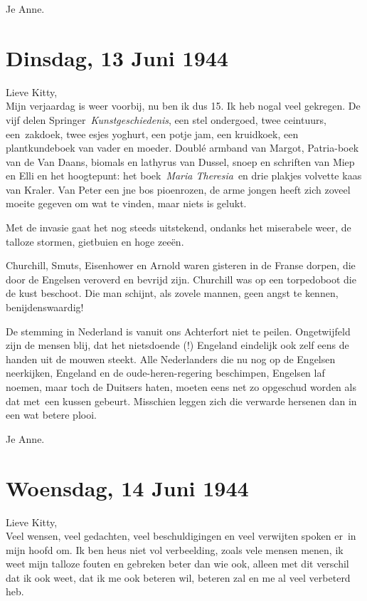 \documentclass{book}
\begin{document}
Je Anne.

\chapter{Dinsdag, 13 Juni 1944}

Lieve Kitty,\\Mijn verjaardag is weer voorbij, nu ben ik dus 15. Ik heb
nogal veel gekregen. De vijf delen Springer~\emph{Kunstgeschiedenis},
een stel ondergoed, twee ceintuurs, een~zakdoek, twee esjes yoghurt, een
potje jam, een kruidkoek, een plantkundeboek van vader en moeder. Doublé
armband van Margot, Patria-boek van de Van Daans, biomals en lathyrus
van Dussel, snoep en schriften van Miep en Elli en het hoogtepunt: het
boek~\emph{Maria Theresia}~en drie plakjes volvette kaas van Kraler. Van
Peter een jne bos pioenrozen, de arme jongen heeft zich zoveel moeite
gegeven om wat te vinden, maar niets is gelukt.

Met de invasie gaat het nog steeds uitstekend, ondanks het miserabele
weer, de talloze stormen, gietbuien en hoge zeeën.

Churchill, Smuts, Eisenhower en Arnold waren gisteren in de Franse
dorpen, die door de Engelsen veroverd en bevrijd zijn. Churchill was op
een torpedoboot die de kust beschoot. Die man schijnt, als zovele
mannen, geen angst te kennen, benijdenswaardig!

De stemming in Nederland is vanuit ons Achterfort niet te peilen.
Ongetwijfeld zijn de mensen blij, dat het nietsdoende (!) Engeland
eindelijk ook zelf eens de handen uit de mouwen steekt. Alle
Nederlanders die nu nog op de Engelsen neerkijken, Engeland en de
oude-heren-regering beschimpen, Engelsen laf noemen, maar toch de
Duitsers haten, moeten eens net zo opgeschud worden als dat met~een
kussen gebeurt. Misschien leggen zich die verwarde hersenen dan in een
wat betere plooi.

Je Anne.

\chapter{Woensdag, 14 Juni 1944}

Lieve Kitty,\\Veel wensen, veel gedachten, veel beschuldigingen en veel
verwijten spoken er~in mijn hoofd om. Ik ben heus niet vol verbeelding,
zoals vele mensen menen, ik weet mijn talloze fouten en gebreken beter
dan wie ook, alleen met dit verschil dat ik ook weet, dat ik me ook
beteren wil, beteren zal en me al veel verbeterd heb.
\end{document}
